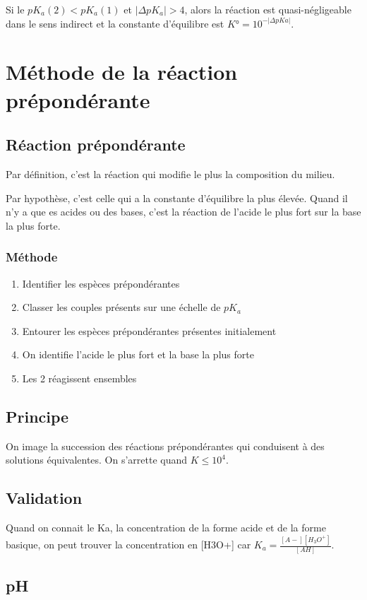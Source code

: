 \documentclass[french]{yLectureNote}
\begin{document}
Si le \(pK_a(2)<pK_a(1)\) et \(|\Delta pK_a| >4\), alors la réaction est quasi-négligeable dans le sens indirect et la constante d'équilibre est \(K°=10^{-|\Delta pKa|}\).
\section{Méthode de la réaction prépondérante}
\subsection{Réaction prépondérante}
Par définition, c'est la réaction qui modifie le plus la composition du milieu.

Par hypothèse, c'est celle qui a la constante d'équilibre la plus élevée. Quand il n'y a que es acides ou des bases, c'est la réaction de l'acide le plus fort sur la base la plus forte.
\subsubsection{Méthode}

\begin{enumerate}
 \item Identifier les espèces prépondérantes
 \item Classer les couples présents sur une échelle de \(pK_a\)
 \item Entourer les espèces prépondérantes présentes initialement
 \item On identifie l'acide le plus fort et la base la plus forte
 \item Les 2 réagissent ensembles
\end{enumerate}
\subsection{Principe}
On image la succession des réactions prépondérantes qui conduisent à des solutions équivalentes. On s'arrette quand $K \leq 10^4$.
\subsection{Validation}
Quand on connait le Ka, la concentration de la forme acide et de la forme basique, on peut trouver la concentration en [H3O+] car \(K_a = \frac{[A-][H_3O^+]}{[AH]}\).
\subsection{pH}
\end{document}
